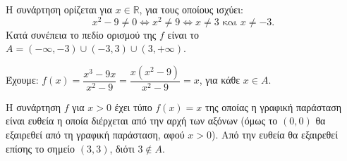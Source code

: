 
\begin{alist}
\item Η συνάρτηση ορίζεται για $x \in \mathbb{R}$, για τους οποίους ισχύει:
\[x^2 - 9 \ne 0 \Leftrightarrow x^2 \ne 9 \Leftrightarrow x \ne 3 \text{ και } x \ne -3.\]
Κατά συνέπεια το πεδίο ορισμού της $f$ είναι το $A = (-\infty, -3) \cup (-3, 3) \cup (3, +\infty)$.

\item Έχουμε: $f(x) = \dfrac{x^3 - 9x}{x^2 - 9} = \dfrac{x(x^2 - 9)}{x^2 - 9} = x$, για κάθε $x \in A$.

\item Η συνάρτηση $f$ για $x > 0$ έχει τύπο $f(x) = x$ της οποίας η γραφική παράσταση είναι ευθεία
η οποία διέρχεται από την αρχή των αξόνων (όμως το $(0, 0)$ θα εξαιρεθεί από τη γραφική
παράσταση, αφού $x > 0$). Από την ευθεία θα εξαιρεθεί επίσης το σημείο $(3, 3)$, διότι $3 \notin A$.
\end{alist}


